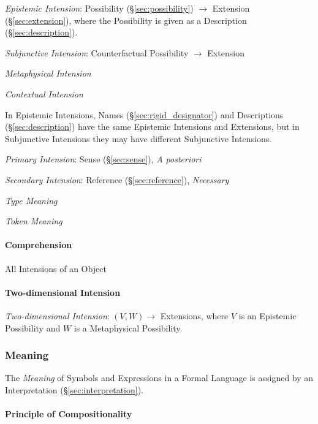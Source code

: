 \emph{Epistemic Intension}: Possibility (\S\ref{sec:possibility}) $\rightarrow$
Extension (\S\ref{sec:extension}), where the Possibility is given as a
Description (\S\ref{sec:description}).

\emph{Subjunctive Intension}: Counterfactual Possibility $\rightarrow$ Extension

\emph{Metaphysical Intension} %

\emph{Contextual Intension}

In Epistemic Intensions, Names (\S\ref{sec:rigid_designator}) and Descriptions
(\S\ref{sec:description}) have the same Epistemic Intensions and Extensions, but
in Subjunctive Intensions they may have different Subjunctive Intensions.

\emph{Primary Intension}: Sense (\S\ref{sec:sense}), \emph{A
  posteriori}

\emph{Secondary Intension}: Reference (\S\ref{sec:reference}),
\emph{Necessary}

\emph{Type Meaning}

\emph{Token Meaning}



\paragraph{Comprehension}\label{sec:comprehension}\hfill

All Intensions of an Object



\paragraph{Two-dimensional Intension}\label{sec:twodimensional_intension}\hfill

\emph{Two-dimensional Intension}: $(V,W) \rightarrow$ Extensions,
where $V$ is an Epistemic Possibility and $W$ is a Metaphysical
Possibility.



\subsubsection{Meaning}\label{sec:meaning}

The \emph{Meaning} of Symbols and Expressions in a Formal Language is
assigned by an Interpretation (\S\ref{sec:interpretation}).



\paragraph{Principle of Compositionality}\label{sec:compositionality}
\hfill

